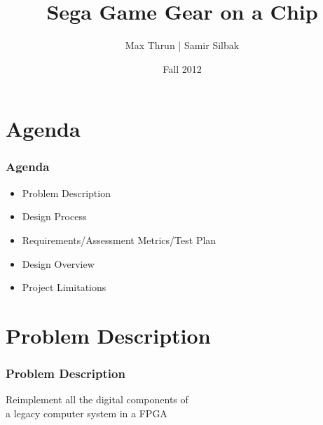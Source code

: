 \documentclass{beamer}
\title{Sega Game Gear on a Chip}
\author{Max Thrun | Samir Silbak}
\institute{University of Cincinnati}
\date{Fall 2012}
\newlength{\wideitemsep}
\let\olditem\item
\renewcommand{\item}{\setlength{\itemsep}{\wideitemsep}\olditem}
\begin{document}
\maketitle

%
%

\section{Agenda}
\begin{frame}
\frametitle{Agenda}
    \begin{itemize}
        \item Problem Description
        \item Design Process
        \item Requirements/Assessment Metrics/Test Plan
        \item Design Overview
        \item Project Limitations
    \end{itemize}
\end{frame}

\section{Problem Description}
\begin{frame}
    \frametitle{Problem Description}
    \begin{center}
        \Large
        Reimplement all the digital components of \\a legacy computer system in a FPGA
    \end{center}
\end{frame}
\end{document}
